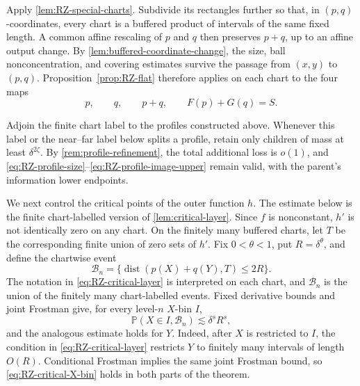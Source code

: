 \documentclass[11pt]{article}
\begin{document}
Apply \cref{lem:RZ-special-charts}.  Subdivide its rectangles further
so that, in \((p,q)\)-coordinates, every chart is a buffered product
of intervals of the same fixed length.  A common affine rescaling of
\(p\) and \(q\) then preserves \(p+q\), up to an affine output
change.  By \cref{lem:buffered-coordinate-change}, the size, ball
nonconcentration, and covering estimates survive the passage from
\((x,y)\) to \((p,q)\).  Proposition~\ref{prop:RZ-flat} therefore
applies on each chart to the four maps
\begin{equation}
 p,\qquad q,\qquad p+q,\qquad F(p)+G(q)=S.
 \label{eq:RZ-four-chart-maps}
\end{equation}

Adjoin the finite chart label to the profiles constructed above.
Whenever this label or the near--far label below splits a profile,
retain only children of mass at least \(\delta^{2\zeta}\).
By \cref{rem:profile-refinement}, the total additional loss is
\(o(1)\), and
\eqref{eq:RZ-profile-size}--\eqref{eq:RZ-profile-image-upper}
remain valid, with the parent's information lower endpoints.

We next control the critical points of the outer function \(h\).
The estimate below is the finite chart-labelled version of
\cref{lem:critical-layer}.
Since \(f\) is nonconstant, \(h'\) is not identically zero on any
chart.  On the finitely many buffered charts, let \(T\) be the
corresponding finite union of zero sets of \(h'\).  Fix
\(0<\theta<1\), put
\(R=\delta^\theta\), and define the chartwise event
\begin{equation}
 \mathcal B_n
 =\{\operatorname{dist}(p(X)+q(Y),T)\le2R\}.
 \label{eq:RZ-critical-layer}
\end{equation}
The notation in \eqref{eq:RZ-critical-layer} is interpreted on each
chart, and \(\mathcal B_n\) is the union of the finitely many
chart-labelled events.  Fixed derivative bounds and joint Frostman
give, for every level-\(n\) \(X\)-bin \(I\),
\begin{equation}
 \mathbb P(X\in I,\mathcal B_n)\lesssim\delta^sR^s,
 \label{eq:RZ-critical-X-bin}
\end{equation}
and the analogous estimate holds for \(Y\).  Indeed, after \(X\) is
restricted to \(I\), the condition in
\eqref{eq:RZ-critical-layer} restricts \(Y\) to finitely many
intervals of length \(O(R)\).  Conditional Frostman implies the same
joint Frostman bound, so \eqref{eq:RZ-critical-X-bin} holds in both
parts of the theorem.
\end{document}
